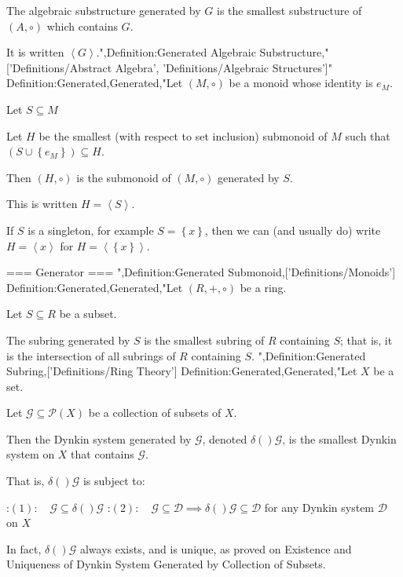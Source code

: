 The algebraic substructure generated by $G$ is the smallest substructure of $\left( A, \circ \right)$ which contains $G$.


It is written ${\left\langle G \right\rangle}$.",Definition:Generated Algebraic Substructure,"['Definitions/Abstract Algebra', 'Definitions/Algebraic Structures']"
Definition:Generated,Generated,"Let $\left( M, \circ \right)$ be a monoid whose identity is $e_M$.

Let $S \subseteq M$

Let $H$ be the smallest (with respect to set inclusion) submonoid of $M$ such that $\left( S \cup \left\lbrace e_M \right\rbrace  \right) \subseteq H$.


Then $\left( H, \circ \right)$ is the submonoid of $\left( M, \circ \right)$ generated by $S$.


This is written $H = {\left\langle S \right\rangle}$.


If $S$ is a singleton, for example $S = \left\lbrace x \right\rbrace$, then we can (and usually do) write $H = {\left\langle x \right\rangle}$ for $H = {\left\langle \left\lbrace x \right\rbrace \right\rangle}$.


=== Generator ===
",Definition:Generated Submonoid,['Definitions/Monoids']
Definition:Generated,Generated,"Let $\left( R, +, \circ \right)$ be a ring.

Let $S \subseteq R$ be a subset.


The subring generated by $S$ is the smallest subring of $R$ containing $S$; that is, it is the intersection of all subrings of $R$ containing $S$.
",Definition:Generated Subring,['Definitions/Ring Theory']
Definition:Generated,Generated,"Let $X$ be a set.

Let $\mathcal G \subseteq \mathcal P \left( X \right)$ be a collection of subsets of $X$.


Then the Dynkin system generated by $\mathcal G$, denoted $\delta \left(   \right)\mathcal G$, is the smallest Dynkin system on $X$ that contains $\mathcal G$.

That is, $\delta \left(   \right)\mathcal G$ is subject to:

:$(1):\quad \mathcal G \subseteq \delta \left(   \right)\mathcal G$
:$(2):\quad \mathcal G \subseteq \mathcal D \implies \delta \left(   \right)\mathcal G \subseteq \mathcal D$ for any Dynkin system $\mathcal D$ on $X$


In fact, $\delta \left(   \right)\mathcal G$ always exists, and is unique, as proved on Existence and Uniqueness of Dynkin System Generated by Collection of Subsets.


